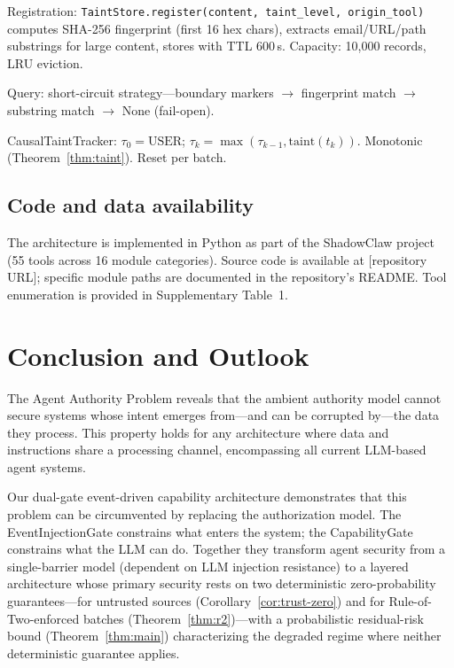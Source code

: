 \documentclass[pdflatex,sn-nature]{sn-jnl}%
\theoremstyle{thmstyleone}%
\theoremstyle{thmstyletwo}%
\theoremstyle{thmstylethree}%
\begin{document}
Registration: \texttt{TaintStore.register(content, taint\_level, origin\_tool)} computes SHA-256 fingerprint (first 16 hex chars), extracts email/URL/path substrings for large content, stores with TTL 600\,s. Capacity: 10,000 records, LRU eviction.

Query: short-circuit strategy---boundary markers $\to$ fingerprint match $\to$ substring match $\to$ None (fail-open).

CausalTaintTracker: $\tau_0 = \text{USER}$;\; $\tau_k = \max(\tau_{k-1}, \text{taint}(t_k))$. Monotonic (Theorem~\ref{thm:taint}). Reset per batch.

\subsection{Code and data availability}\label{subsec:meth-code}

The architecture is implemented in Python as part of the ShadowClaw project (55 tools across 16 module categories). Source code is available at [repository URL]; specific module paths are documented in the repository's README. Tool enumeration is provided in Supplementary Table~1.

\section{Conclusion and Outlook}\label{sec:conclusion}

The Agent Authority Problem reveals that the ambient authority model cannot secure systems whose intent emerges from---and can be corrupted by---the data they process. This property holds for any architecture where data and instructions share a processing channel, encompassing all current LLM-based agent systems.

Our dual-gate event-driven capability architecture demonstrates that this problem can be circumvented by replacing the authorization model. The EventInjectionGate constrains what enters the system; the CapabilityGate constrains what the LLM can do. Together they transform agent security from a single-barrier model (dependent on LLM injection resistance) to a layered architecture whose primary security rests on two deterministic zero-probability guarantees---for untrusted sources (Corollary~\ref{cor:trust-zero}) and for Rule-of-Two-enforced batches (Theorem~\ref{thm:r2})---with a probabilistic residual-risk bound (Theorem~\ref{thm:main}) characterizing the degraded regime where neither deterministic guarantee applies.
\end{document}
